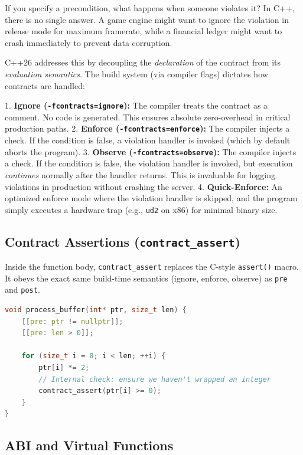 {{{{If you specify a precondition, what happens when someone violates it? In C++, there is no single answer. A game engine might want to ignore the violation in release mode for maximum framerate, while a financial ledger might want to crash immediately to prevent data corruption.

C++26 addresses this by decoupling the \textit{declaration} of the contract from its \textit{evaluation semantics}. The build system (via compiler flags) dictates how contracts are handled:

1. \textbf{Ignore (\texttt{-fcontracts=ignore}):} The compiler treats the contract as a comment. No code is generated. This ensures absolute zero-overhead in critical production paths.
2. \textbf{Enforce (\texttt{-fcontracts=enforce}):} The compiler injects a check. If the condition is false, a violation handler is invoked (which by default aborts the program).
3. \textbf{Observe (\texttt{-fcontracts=observe}):} The compiler injects a check. If the condition is false, the violation handler is invoked, but execution \textit{continues} normally after the handler returns. This is invaluable for logging violations in production without crashing the server.
4. \textbf{Quick-Enforce:} An optimized enforce mode where the violation handler is skipped, and the program simply executes a hardware trap (e.g., \texttt{ud2} on x86) for minimal binary size.

\subsection{Contract Assertions (\texttt{contract_assert})}

Inside the function body, \texttt{contract_assert} replaces the C-style \texttt{assert()} macro. It obeys the exact same build-time semantics (ignore, enforce, observe) as \texttt{pre} and \texttt{post}.

\begin{lstlisting}[language=C++]
void process_buffer(int* ptr, size_t len) {
    [[pre: ptr != nullptr]];
    [[pre: len > 0]];
    
    for (size_t i = 0; i < len; ++i) {
        ptr[i] *= 2;
        // Internal check: ensure we haven't wrapped an integer
        contract_assert(ptr[i] >= 0); 
    }
}
\end{lstlisting}

\subsection{ABI and Virtual Functions}

}}}}
